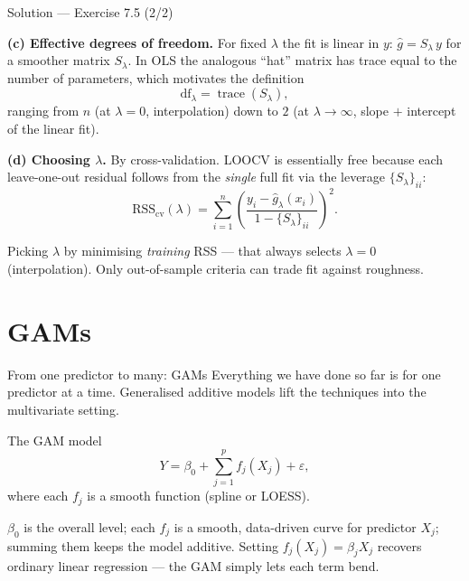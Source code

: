 \documentclass[aspectratio=169,11pt]{beamer}
\begin{document}
\begin{frame}{Solution --- Exercise 7.5 (2/2)}
\begin{solutionbox}
\textbf{(c) Effective degrees of freedom.} For fixed $\lambda$ the fit is linear in $y$: $\hat g=S_\lambda\,y$ for a smoother matrix $S_\lambda$. In OLS the analogous ``hat'' matrix has trace equal to the number of parameters, which motivates the definition
\[ \mathrm{df}_\lambda=\operatorname{trace}(S_\lambda), \]
ranging from $n$ (at $\lambda=0$, interpolation) down to $2$ (at $\lambda\to\infty$, slope $+$ intercept of the linear fit).

\medskip
\textbf{(d) Choosing $\lambda$.} By cross-validation. LOOCV is essentially free because each leave-one-out residual follows from the \emph{single} full fit via the leverage $\{S_\lambda\}_{ii}$:
\[ \mathrm{RSS}_{\text{cv}}(\lambda)=\sum_{i=1}^n\!\left(\frac{y_i-\hat g_\lambda(x_i)}{1-\{S_\lambda\}_{ii}}\right)^{\!2}. \]
\end{solutionbox}
\begin{mistake}
Picking $\lambda$ by minimising \emph{training} RSS --- that always selects $\lambda=0$ (interpolation). Only out-of-sample criteria can trade fit against roughness.
\end{mistake}
\end{frame}


\section{GAMs}

\begin{frame}{From one predictor to many: GAMs}
  Everything we have done so far is for one predictor at a time.
  Generalised additive models lift the techniques into the
  multivariate setting.
  \begin{block}{The GAM model}
    \[
      \boxed{\;
        Y = \beta_0 + \sum_{j=1}^p f_j(X_j) + \varepsilon,
      \;}
    \]
    where each $f_j$ is a smooth function (spline or LOESS).
  \end{block}
  \begin{readme}
    $\beta_0$ is the overall level; each $f_j$ is a smooth,
    data-driven curve for predictor $X_j$; summing them keeps the model
    additive. Setting $f_j(X_j)=\beta_j X_j$ recovers ordinary linear
    regression --- the GAM simply lets each term bend.
  \end{readme}
\end{frame}
\end{document}
